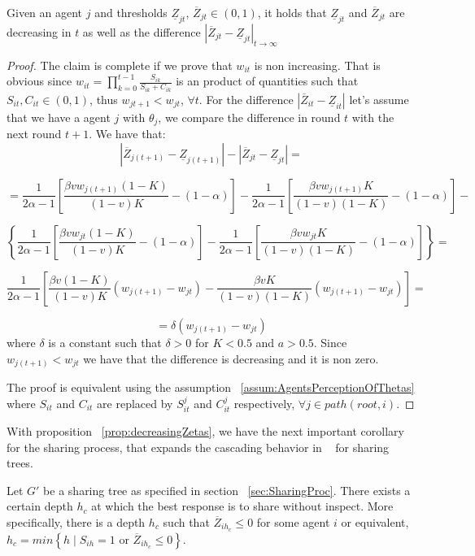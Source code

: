 \begin{prop}
	Given an agent $j$ and thresholds $\underline{Z}_{jt}$, $ \overline{Z}_{jt} \in (0,1)$, it holds that $\underline{Z}_{jt}$ and $ \overline{Z}_{jt}$ are decreasing in $t$ as well as the difference  $|\overline{Z}_{jt} - \underline{Z}_{jt}|_{t \rightarrow \infty}$
	\label{prop:decreasingZetas}
\end{prop}

\begin{proof}
	The claim is complete if we prove that $w_{it}$ is non increasing. That is obvious since $w_{it} = \displaystyle\prod_{k=0}^{t-1} \frac{S_{ik}}{S_{ik}+C_{ik}}$ is an product of quantities such that $ S_{it}, C_{it} \in (0,1)$, thus $w_{jt+1} < w_{jt}$, $\forall t$. For the difference $|\overline{Z}_{it} - \underline{Z}_{it}|$ let's assume that we have a agent $j$ with $\theta_j$, we compare the difference in round $t$ with the next round $t+1$. We have that:
	$$|\overline{Z}_{j(t+1)} - \underline{Z}_{j(t+1)}|-|\overline{Z}_{jt} - \underline{Z}_{jt}|=$$
	
	$$=
	\displaystyle\frac{1}{2\alpha-1}\left[\frac{\beta v w_{j(t+1)} (1-K)}{(1-v)K}-(1-\alpha)\right]-\displaystyle\frac{1}{2\alpha-1}\left[\frac{\beta v w_{j(t+1)} K}{(1-v)(1-K)}-(1-\alpha)\right]- $$
	
	$$\left\{
	\displaystyle\frac{1}{2\alpha-1}\left[\frac{\beta v w_{jt} (1-K)}{(1-v)K}-(1-\alpha)\right]-\displaystyle\frac{1}{2\alpha-1}\left[\frac{\beta v w_{jt} K}{(1-v)(1-K)}-(1-\alpha)\right]\right\}=$$
	
	$$\displaystyle\frac{1}{2\alpha-1} \left[ \frac{\beta v (1-K)}{(1-v)K} (w_{j(t+1)}-w_{jt}) -
	 \frac{\beta v K}{(1-v)(1-K)} (w_{j(t+1)}-w_{jt})\right]=
	$$
	
	$$ = \delta (w_{j(t+1)}-w_{jt})
	$$
	where $\delta$ is a constant such that $\delta>0$ for $K<0.5$ and $a>0.5$. Since $w_{j(t+1)}<w_{jt}$ we have that the difference is decreasing and it is non zero.
	
	The proof is equivalent using the assumption ~\ref{assum:AgentsPerceptionOfThetas} where $S_{it}$ and $C_{it}$ are replaced by $S_{it}^j$ and $C_{it}^j$ respectively, $\forall j \in path(root,i)$.
\end{proof}

With proposition ~\ref{prop:decreasingZetas}, we have the next important corollary for the sharing process, that expands the cascading behavior in ~\cite{papanastasiou} for sharing trees.

\begin{corollary}
	Let $G'$ be a sharing tree as specified in section ~\ref{sec:SharingProc}. There exists a certain depth $h_c$ at which the best response is to share without inspect. More specifically, there is a depth $h_c$ such that $\overline{Z}_{ih_c} \leq 0$ for some agent $i$ or equivalent, $h_c = min \left\{h \mid S_{ih}=1 \text{ or } \overline{Z}_{ih_c} \leq 0\right\}$.
\end{corollary}


